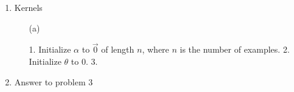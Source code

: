 \begin{enumerate}
\begin{enumerate}
  \end{enumerate}
\item Kernels
  \begin{enumerate}
    \item[(a)]
      \begin{algorithm}
        1. Initialize $\alpha$ to $\vec{0}$ of length $n$, where $n$ is the number of examples.
        2. Initialize $\theta$ to $0$.
        3. 
      \end{algorithm}
  \end{enumerate}
\item Answer to problem 3
\end{enumerate}



